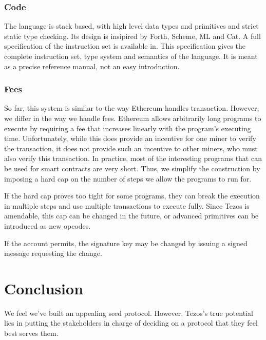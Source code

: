 \documentclass[letterpaper]{article}
\begin{document}
\subsubsection{Code}


The language is stack based, with high level data types and primitives and strict
static type checking. Its design is insipired by Forth, Scheme, ML and Cat.
A full specification of the instruction set is available in\cite{language}.
This specification gives the complete instruction set, type system and semantics
of the language. It is meant as a precise reference manual, not an easy introduction.


\subsubsection{Fees}

So far, this system is similar to the way Ethereum handles transaction. However,
 we differ in the way we handle fees. Ethereum allows arbitrarily long programs
to execute by requiring a fee that increases linearly with the program's
executing time. Unfortunately, while this does provide an incentive for one
miner to verify the transaction, it does not provide such an incentive to other
miners, who must also verify this transaction. In practice, most of the
interesting programs that can be used for smart contracts are very short.
Thus, we simplify the construction by imposing a hard cap on the number of steps
we allow the programs to run for.

If the hard cap proves too tight for some programs, they can break the execution
in multiple steps and use multiple transactions to execute fully. Since Tezos is
amendable, this cap can be changed in the future, or advanced primitives can be
introduced as new opcodes.

If the account permits, the signature key may be changed by issuing a signed
message requesting the change.


\section{Conclusion}
We feel we've built an appealing seed protocol. However, Tezos's true potential
lies in putting the stakeholders in charge of deciding on a protocol that they
feel best serves them.




\end{document}
